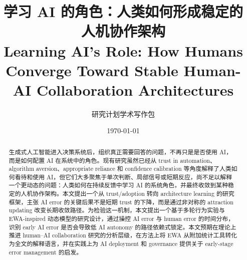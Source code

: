 \documentclass[11pt,a4paper]{ctexart}
\title{学习 AI 的角色：人类如何形成稳定的人机协作架构\\
\large Learning AI's Role: How Humans Converge Toward Stable Human-AI Collaboration Architectures}
\author{研究计划学术写作包}
\date{\today}
\begin{document}
\maketitle

\begin{abstract}
生成式人工智能进入决策系统后，组织真正需要回答的问题，不再只是是否使用 AI，而是如何配置 AI 在系统中的角色。现有研究虽然已经从 trust in automation、algorithm aversion、appropriate reliance 和 confidence calibration 等角度解释了人类如何看待和使用 AI，但它们大多聚焦于单次判断、局部信号或短期反应，尚不足以解释一个更动态的问题：人类如何在持续反馈中学习 AI 的系统角色，并最终收敛到某种稳定的人机协作架构。本文提出一个从 trust/adoption 转向 architecture learning 的研究框架，主张 AI error 的关键后果不是短期 trust 的下降，而是通过非对称的 attraction updating 改变长期收敛路径。为检验这一机制，本文提出一个基于多轮行为实验与 EWA-inspired 动态模型的研究设计，通过操控 AI error 与 human error 的时间分布，识别 early AI error 是否会导致低 AI autonomy 的路径依赖式锁定。本文预期在理论上推进 human--AI collaboration 研究的分析层级，在方法上将 EWA 从附加统计工具转化为全文的解释语言，并在实践上为 AI deployment 和 governance 提供关于 early-stage error management 的启发。
\end{abstract}

\tableofcontents
\newpage










\end{document}
